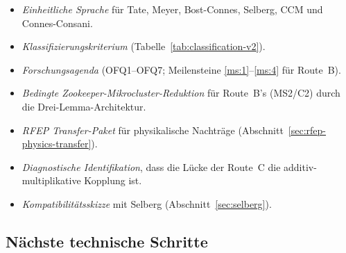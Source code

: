 \documentclass[11pt,a4paper]{article}
\theoremstyle{plain}
\theoremstyle{definition}
\begin{document}
\begin{itemize}
\item \emph{Einheitliche Sprache} für Tate, Meyer, Bost-Connes, Selberg, CCM und Connes-Consani.
\item \emph{Klassifizierungskriterium} (Tabelle~\ref{tab:classification-v2}).
\item \emph{Forschungsagenda} (OFQ1--OFQ7; Meilensteine \ref{ms:1}--\ref{ms:4} für Route~B).
\item \emph{Bedingte Zookeeper-Mikrocluster-Reduktion} für Route~B's (MS2/C2)
  durch die Drei-Lemma-Architektur.
\item \emph{RFEP Transfer-Paket} für physikalische Nachträge (Abschnitt~\ref{sec:rfep-physics-transfer}).
\item \emph{Diagnostische Identifikation}, dass die Lücke der Route~C die additiv-multiplikative Kopplung ist.
\item \emph{Kompatibilitätsskizze} mit Selberg (Abschnitt~\ref{sec:selberg}).
\end{itemize}

\subsection{Nächste technische Schritte}
\end{document}
